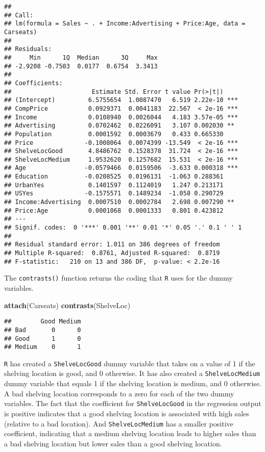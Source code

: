 \documentclass[]{article}
\newenvironment{Shaded}{\begin{snugshade}}{\end{snugshade}}
\newcommand{\KeywordTok}[1]{\textcolor[rgb]{0.13,0.29,0.53}{\textbf{#1}}}
\newcommand{\NormalTok}[1]{#1}
\begin{document}
\begin{verbatim}
## 
## Call:
## lm(formula = Sales ~ . + Income:Advertising + Price:Age, data = Carseats)
## 
## Residuals:
##     Min      1Q  Median      3Q     Max 
## -2.9208 -0.7503  0.0177  0.6754  3.3413 
## 
## Coefficients:
##                      Estimate Std. Error t value Pr(>|t|)    
## (Intercept)         6.5755654  1.0087470   6.519 2.22e-10 ***
## CompPrice           0.0929371  0.0041183  22.567  < 2e-16 ***
## Income              0.0108940  0.0026044   4.183 3.57e-05 ***
## Advertising         0.0702462  0.0226091   3.107 0.002030 ** 
## Population          0.0001592  0.0003679   0.433 0.665330    
## Price              -0.1008064  0.0074399 -13.549  < 2e-16 ***
## ShelveLocGood       4.8486762  0.1528378  31.724  < 2e-16 ***
## ShelveLocMedium     1.9532620  0.1257682  15.531  < 2e-16 ***
## Age                -0.0579466  0.0159506  -3.633 0.000318 ***
## Education          -0.0208525  0.0196131  -1.063 0.288361    
## UrbanYes            0.1401597  0.1124019   1.247 0.213171    
## USYes              -0.1575571  0.1489234  -1.058 0.290729    
## Income:Advertising  0.0007510  0.0002784   2.698 0.007290 ** 
## Price:Age           0.0001068  0.0001333   0.801 0.423812    
## ---
## Signif. codes:  0 '***' 0.001 '**' 0.01 '*' 0.05 '.' 0.1 ' ' 1
## 
## Residual standard error: 1.011 on 386 degrees of freedom
## Multiple R-squared:  0.8761, Adjusted R-squared:  0.8719 
## F-statistic:   210 on 13 and 386 DF,  p-value: < 2.2e-16
\end{verbatim}

The \texttt{contrasts()} function returns the coding that \texttt{R}
uses for the dummy variables.

\begin{Shaded}
\begin{Highlighting}[]
\KeywordTok{attach}\NormalTok{(Carseats)}
\KeywordTok{contrasts}\NormalTok{(ShelveLoc)}
\end{Highlighting}
\end{Shaded}

\begin{verbatim}
##        Good Medium
## Bad       0      0
## Good      1      0
## Medium    0      1
\end{verbatim}

\texttt{R} has created a \texttt{ShelveLocGood} dummy variable that
takes on a value of 1 if the shelving location is good, and 0 otherwise.
It has also created a \texttt{ShelveLocMedium} dummy variable that
equals 1 if the shelving location is medium, and 0 otherwise. A bad
shelving location corresponds to a zero for each of the two dummy
variables. The fact that the coefficient for \texttt{ShelveLocGood} in
the regression output is positive indicates that a good shelving
location is associated with high sales (relative to a bad location). And
\texttt{ShelveLocMedium} has a smaller positive coefficient, indicating
that a medium shelving location leads to higher sales than a bad
shelving location but lower sales than a good shelving location.
\end{document}
